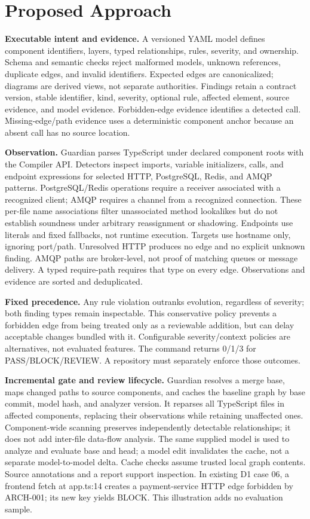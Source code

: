 \documentclass[conference]{IEEEtran}
\begin{document}
\section{Proposed Approach}
\textbf{Executable intent and evidence.} A versioned YAML model defines component identifiers, layers, typed relationships, rules, severity, and ownership. Schema and semantic checks reject malformed models, unknown references, duplicate edges, and invalid identifiers. Expected edges are canonicalized; diagrams are derived views, not separate authorities. Findings retain a contract version, stable identifier, kind, severity, optional rule, affected element, source evidence, and model evidence. Forbidden-edge evidence identifies a detected call. Missing-edge/path evidence uses a deterministic component anchor because an absent call has no source location.

\textbf{Observation.} Guardian parses TypeScript under declared component roots with the Compiler API. Detectors inspect imports, variable initializers, calls, and endpoint expressions for selected HTTP, PostgreSQL, Redis, and AMQP patterns. PostgreSQL/Redis operations require a receiver associated with a recognized client; AMQP requires a channel from a recognized connection. These per-file name associations filter unassociated method lookalikes but do not establish soundness under arbitrary reassignment or shadowing. Endpoints use literals and fixed fallbacks, not runtime execution. Targets use hostname only, ignoring port/path. Unresolved HTTP produces no edge and no explicit unknown finding. AMQP paths are broker-level, not proof of matching queues or message delivery. A typed require-path requires that type on every edge. Observations and evidence are sorted and deduplicated.

\textbf{Fixed precedence.} Any rule violation outranks evolution, regardless of severity; both finding types remain inspectable. This conservative policy prevents a forbidden edge from being treated only as a reviewable addition, but can delay acceptable changes bundled with it. Configurable severity/context policies are alternatives, not evaluated features. The command returns 0/1/3 for PASS/BLOCK/REVIEW. A repository must separately enforce those outcomes.

\textbf{Incremental gate and review lifecycle.} Guardian resolves a merge base, maps changed paths to source components, and caches the baseline graph by base commit, model hash, and analyzer version. It reparses all TypeScript files in affected components, replacing their observations while retaining unaffected ones. Component-wide scanning preserves independently detectable relationships; it does not add inter-file data-flow analysis. The same supplied model is used to analyze and evaluate base and head; a model edit invalidates the cache, not a separate model-to-model delta. Cache checks assume trusted local graph contents. Source annotations and a report support inspection. In existing D1 case 06, a frontend fetch at app.ts:14 creates a payment-service HTTP edge forbidden by ARCH-001; its new key yields BLOCK. This illustration adds no evaluation sample.
\end{document}
